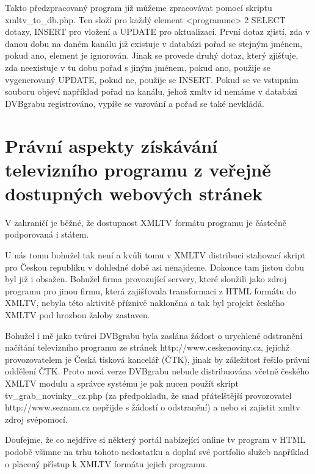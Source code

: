 \vspace{10pt}

Takto předzpracovaný program již můžeme zpracovávat pomocí skriptu xmltv\_to\_db.php. Ten složí pro každý element <programme> 2 SELECT dotazy, INSERT pro vložení a UPDATE pro aktualizaci. První dotaz zjistí, zda v danou dobu na daném kanálu již existuje v databázi pořad se stejným jménem, pokud ano, element je ignorován. Jinak se provede druhý dotaz, který zjišťuje, zda neexistuje v tu dobu pořad s jiným jménem, pokud ano, použije se vygenerovaný UPDATE, pokud ne, použije se INSERT. Pokud se ve vstupním souboru objeví například pořad na kanálu, jehož xmltv id nemáme v databázi DVBgrabu registrováno, vypíše se varování a pořad se také nevkládá.

\vspace{10pt}

\section{Právní aspekty získávání televizního programu z veřejně dostupných webových stránek}

\vspace{10pt}

V zahraničí je běžné, že dostupnost XMLTV formátu programu je částečně podporovaná i státem. 

\vspace{10pt}

U nás tomu bohužel tak není a kvůli tomu v XMLTV distribuci stahovací skript pro Českou republiku v dohledné době asi nenajdeme. Dokonce tam jistou dobu byl již i obsažen. Bohužel firma provozující servery, které sloužili jako zdroj programu pro jinou firmu, která zajišťovala transformaci z HTML formátu do XMLTV, nebyla této aktivitě příznivě nakloněna a tak byl projekt českého XMLTV pod hrozbou žaloby zastaven.

\vspace{10pt}

Bohužel i mě jako tvůrci DVBgrabu byla zaslána žádost o urychlené odstranění načítání televizního programu ze stránek http://www.ceskenoviny.cz, jejichž provozovatelem je Česká tisková kancelář (ČTK), jinak by záležitost řešilo právní oddělení ČTK. Proto nová verze DVBgrabu nebude distribuována včetně českého XMLTV modulu a správce systému je pak nucen použít skript tv\_grab\_novinky\_cz.php (za předpokladu, že snad přátelštější provozovatel http://www.seznam.cz nepřijde s žádostí o odstranění) a nebo si zajistit xmltv zdroj svépomocí.

\vspace{10pt}

Doufejme, že co nejdříve si některý portál nabízející online tv program v HTML podobě všimne na trhu tohoto nedostatku a doplní své portfolio služeb například o placený přístup k XMLTV formátu jejich programu.
